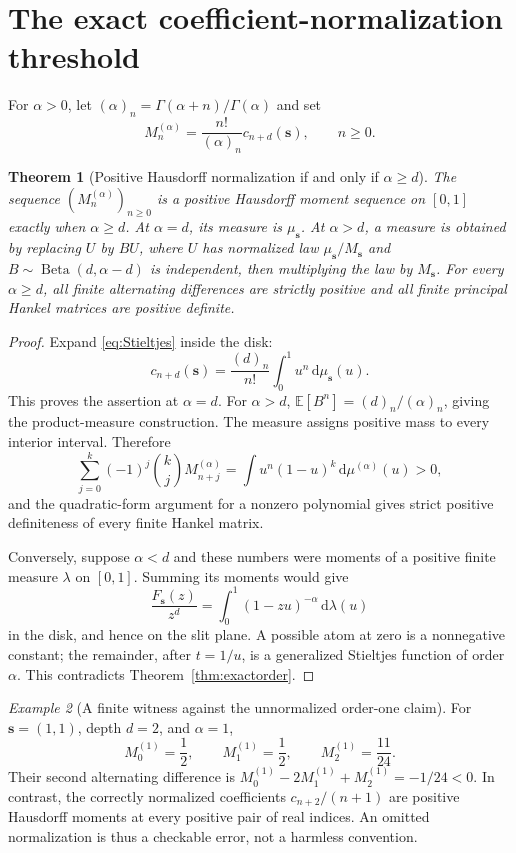 \documentclass[11pt]{article}
\numberwithin{equation}{section}
\newtheorem{theorem}{Theorem}[section]
\theoremstyle{definition}
\theoremstyle{remark}
\newtheorem{example}[theorem]{Example}
\newcommand{\dd}{\,\mathrm d}
\newcommand{\E}{\mathbb E}
\newcommand{\sv}{\boldsymbol s}
\begin{document}
\section{The exact coefficient-normalization threshold}
\label{sec:normalization}
For $\alpha>0$, let $(\alpha)_n=\Gamma(\alpha+n)/\Gamma(\alpha)$ and
set
\begin{equation}\label{eq:normalization}
 M_n^{(\alpha)}=\frac{n!}{(\alpha)_n}c_{n+d}(\sv),\qquad n\ge0.
\end{equation}
\begin{theorem}[Positive Hausdorff normalization if and only if $\alpha\ge d$]
\label{thm:normalization}
The sequence $(M_n^{(\alpha)})_{n\ge0}$ is a positive Hausdorff moment
sequence on $[0,1]$ exactly when $\alpha\ge d$.
At $\alpha=d$, its measure is $\mu_{\sv}$. At $\alpha>d$, a measure
is obtained by replacing $U$ by $BU$, where $U$ has normalized law
$\mu_{\sv}/M_{\sv}$ and $B\sim\operatorname{Beta}(d,\alpha-d)$ is
independent, then multiplying the law by $M_{\sv}$.
For every $\alpha\ge d$, all finite alternating differences are
strictly positive and all finite principal Hankel matrices are
positive definite.
\end{theorem}
\begin{proof}
Expand \eqref{eq:Stieltjes} inside the disk:
\[
 c_{n+d}(\sv)=\frac{(d)_n}{n!}\int_0^1u^n\dd\mu_{\sv}(u).
\]
This proves the assertion at $\alpha=d$. For $\alpha>d$,
$\E[B^n]=(d)_n/(\alpha)_n$, giving the product-measure construction.
The measure assigns positive mass to every interior interval. Therefore
\[
 \sum_{j=0}^k(-1)^j\binom kj M_{n+j}^{(\alpha)}
 =\int u^n(1-u)^k\dd\mu^{(\alpha)}(u)>0,
\]
and the quadratic-form argument for a nonzero polynomial gives strict
positive definiteness of every finite Hankel matrix.

Conversely, suppose $\alpha<d$ and these numbers were moments of a
positive finite measure $\lambda$ on $[0,1]$. Summing its moments would give
\[
 \frac{F_{\sv}(z)}{z^d}=\int_0^1(1-zu)^{-\alpha}\dd\lambda(u)
\]
in the disk, and hence on the slit plane. A possible atom at zero is
a nonnegative constant; the remainder, after $t=1/u$, is a generalized
Stieltjes function of order $\alpha$. This contradicts
Theorem~\ref{thm:exactorder}.
\end{proof}

\begin{example}[A finite witness against the unnormalized order-one claim]
For $\sv=(1,1)$, depth $d=2$, and $\alpha=1$,
\[
 M_0^{(1)}=\frac12,\qquad M_1^{(1)}=\frac12,
 \qquad M_2^{(1)}=\frac{11}{24}.
\]
Their second alternating difference is
$M_0^{(1)}-2M_1^{(1)}+M_2^{(1)}=-1/24<0$.
In contrast, the correctly normalized coefficients
$c_{n+2}/(n+1)$ are positive Hausdorff moments at every positive pair
of real indices. An omitted normalization is thus a checkable error,
not a harmless convention.
\end{example}
\end{document}

